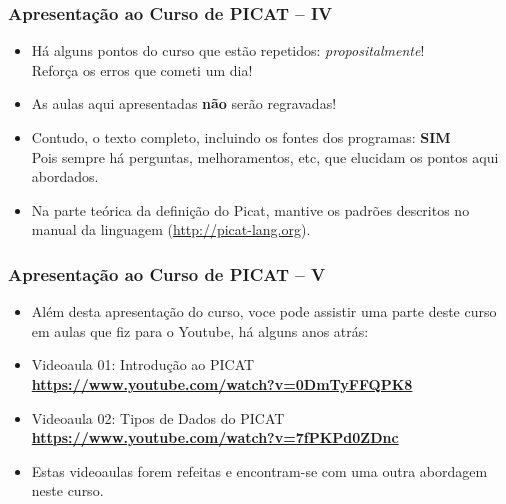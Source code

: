     
\begin{frame}[fragile]
  \frametitle{Apresentação ao Curso de PICAT -- IV}
  \begin{itemize}

    \item Há alguns pontos do curso que estão repetidos: \textit{propositalmente}!\\
    \pause
    Reforça os erros que cometi um dia!

    \pause
    \item As aulas aqui apresentadas \textbf{não} serão regravadas!
        
    \pause 
    \item Contudo, o texto completo, incluindo os fontes dos programas: \textbf{SIM}\\
    Pois sempre há perguntas, melhoramentos, etc, que elucidam os pontos aqui abordados.
    
    \pause 
    \item Na parte teórica da definição do Picat, mantive os padrões 
    descritos no manual da linguagem (\url{http://picat-lang.org}).
    
  \end{itemize}

\end{frame}





    
\begin{frame}[fragile]
  \frametitle{Apresentação ao Curso de PICAT -- V}
  \begin{itemize}

    \item Além desta  apresentação do curso, voce pode assistir uma
    parte deste curso em aulas que fiz para o Youtube, há alguns anos atrás:

    \pause
    \item Videoaula 01: Introdução ao PICAT\\
    \textbf{\url {https://www.youtube.com/watch?v=0DmTyFFQPK8}}

    \pause 
    \item Videoaula 02: Tipos de Dados do PICAT\\
    \textbf{\url {https://www.youtube.com/watch?v=7fPKPd0ZDnc}} 
    
    \item Estas videoaulas forem refeitas e  encontram-se com uma outra abordagem
    neste curso.
    
  \end{itemize}

\end{frame}





